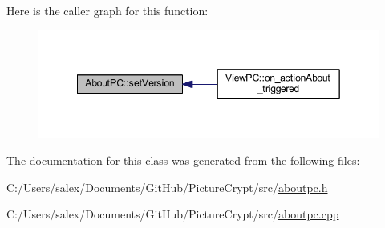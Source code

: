 Here is the caller graph for this function\+:
\nopagebreak
\begin{figure}[H]
\begin{center}
\leavevmode
\includegraphics[width=349pt]{class_about_p_c_aa3815d4826d0c8d87122449537a0a4d5_icgraph}
\end{center}
\end{figure}


The documentation for this class was generated from the following files\+:\begin{DoxyCompactItemize}
\item 
C\+:/\+Users/salex/\+Documents/\+Git\+Hub/\+Picture\+Crypt/src/\mbox{\hyperlink{aboutpc_8h}{aboutpc.\+h}}\item 
C\+:/\+Users/salex/\+Documents/\+Git\+Hub/\+Picture\+Crypt/src/\mbox{\hyperlink{aboutpc_8cpp}{aboutpc.\+cpp}}\end{DoxyCompactItemize}
